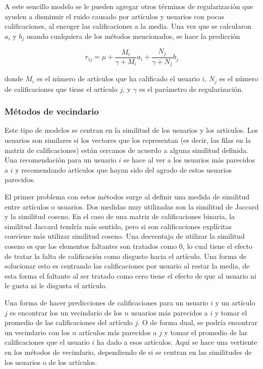 A este sencillo modelo se le pueden agregar otros términos de regularización que ayuden a disminuir el ruido causado por artículos y usuarios con pocas calificaciones, al encoger las calificaciones a la media. Una vez que se calcularon $a_i$ y $b_j$ usando cualquiera de los métodos mencionados, se hace la predicción

\begin{equation}
  \label{ec:modelo_base}
  r_{ij} = \mu + \frac{M_i}{\gamma + M_i} a_i + \frac{N_j}{\gamma + N_j}b_j
\end{equation}

donde $M_i$ es el número de artículos que ha calificado el usuario $i$, $N_j$ es el número de calificaciones que tiene el artículo $j$, y $\gamma$ es el parámetro de regularización.

\subsubsection{Métodos de vecindario}

Este tipo de modelos se centran en la similitud de los usuarios y los artículos. Los usuarios son similares si los vectores que los representan (es decir, las filas en la matriz de calificaciones) están cercanos de acuerdo a alguna similitud definida. Una recomendación para un usuario $i$ se hace al ver a los usuarios más parecidos a $i$ y recomendando artículos que hayan sido del agrado de estos usuarios parecidos.

El primer problema con estos métodos surge al definir una medida de similitud entre artículos o usuarios. Dos medidas muy utilizadas son la similitud de Jaccard y la similitud coseno. En el caso de una matriz de calificaciones binaria, la similitud Jaccard tendría más sentido, pero si son calificaciones explícitas conviene más utilizar similitud coseno. Una desventaja de utilizar la similitud coseno es que los elementos faltantes son tratados como $0$, lo cual tiene el efecto de tratar la falta de calificación como disgusto hacia el artículo. Una forma de solucionar esto es centrando las calificaciones por usuario al restar la media, de esta forma el faltante al ser tratado como cero tiene el efecto de que al usuario ni le gusta ni le disgusta el artículo.

Una forma de hacer predicciones de calificaciones para un usuario $i$ y un artículo $j$ es encontrar los un vecindario de los $n$ usuarios más parecidos a $i$ y tomar el promedio de las calificaciones del artículo $j$. O de forma dual, se podría encontrar un vecindario con los $n$ artículos más parecidos a $j$ y tomar el promedio de las calificaciones que el usuario $i$ ha dado a esos artículos. Aquí se hace una vertiente en los métodos de vecindario, dependiendo de si se centran en las similitudes de los usuarios o de los artículos.

